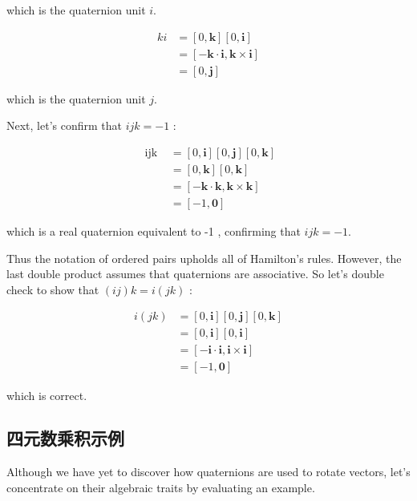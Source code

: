 which is the quaternion unit $i$.

$$
    \begin{aligned}
        k i & =[0, \mathbf{k}][0, \mathbf{i}]                               \\
            & =[-\mathbf{k} \cdot \mathbf{i}, \mathbf{k} \times \mathbf{i}] \\
            & =[0, \mathbf{j}]
    \end{aligned}
$$

which is the quaternion unit $j$.

Next, let's confirm that $i j k=-1$ :

$$
    \begin{aligned}
        \text { ijk } & =[0, \mathbf{i}][0, \mathbf{j}][0, \mathbf{k}]                \\
                      & =[0, \mathbf{k}][0, \mathbf{k}]                               \\
                      & =[-\mathbf{k} \cdot \mathbf{k}, \mathbf{k} \times \mathbf{k}] \\
                      & =[-1, \mathbf{0}]
    \end{aligned}
$$

which is a real quaternion equivalent to -1 , confirming that $i j k=-1$.

Thus the notation of ordered pairs upholds all of Hamilton's rules. However, the last double product assumes that quaternions are associative. So let's double check to show that $(i j) k=i(j k)$ :

$$
    \begin{aligned}
        i(j k) & =[0, \mathbf{i}][0, \mathbf{j}][0, \mathbf{k}]                \\
               & =[0, \mathbf{i}][0, \mathbf{i}]                               \\
               & =[-\mathbf{i} \cdot \mathbf{i}, \mathbf{i} \times \mathbf{i}] \\
               & =[-1, \mathbf{0}]
    \end{aligned}
$$

which is correct.

\subsection{四元数乘积示例}
Although we have yet to discover how quaternions are used to rotate vectors, let's concentrate on their algebraic traits by evaluating an example.

